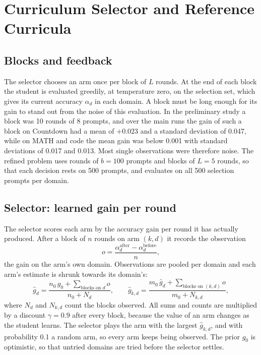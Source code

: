 \section{Curriculum Selector and Reference Curricula}
\label{imp:sec:selectors}

\subsection{Blocks and feedback}

The selector chooses an arm once per block of $L$ rounds. At the end of each block the
student is evaluated greedily, at temperature zero, on the selection set, which gives
its current accuracy $\alpha_d$ in each domain. A block must be long enough for its gain
to stand out from the noise of this evaluation. In the preliminary study a block was 10
rounds of 8 prompts, and over the main runs the gain of such a block on Countdown had a
mean of $+0.023$ and a standard deviation of 0.047, while on MATH and code the mean gain
was below 0.001 with standard deviations of 0.017 and 0.013. Most single observations
were therefore noise. The refined problem uses rounds of $b = 100$ prompts and blocks of
$L = 5$ rounds, so that each decision rests on 500 prompts, and evaluates on all 500
selection prompts per domain.

\subsection{Selector: learned gain per round}
\label{imp:sec:efficiency}

The selector scores each arm by the accuracy gain per round it has actually produced.
After a block of $n$ rounds on arm $(k, d)$ it records the observation
\[
  o = \frac{\alpha_d^{\mathrm{after}} - \alpha_d^{\mathrm{before}}}{n},
\]
the gain on the arm's own domain. Observations are pooled per domain and each arm's
estimate is shrunk towards its domain's:
\[
  \hat{g}_d = \frac{n_0\, g_0 + \sum_{\text{blocks on } d} o}{n_0 + N_d},
  \qquad
  \hat{g}_{k,d} = \frac{m_0\, \hat{g}_d + \sum_{\text{blocks on } (k,d)} o}{m_0 + N_{k,d}},
\]
where $N_d$ and $N_{k,d}$ count the blocks observed. All sums and counts are multiplied
by a discount $\gamma = 0.9$ after every block, because the value of an arm changes as
the student learns. The selector plays the arm with the largest $\hat{g}_{k,d}$, and
with probability 0.1 a random arm, so every arm keeps being observed. The prior $g_0$ is
optimistic, so that untried domains are tried before the selector settles.

